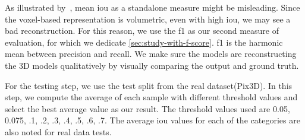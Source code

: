 As illustrated by~\cite{Tatarchenko2019}, mean \gls{iou} as a standalone measure might be misleading.
Since the voxel-based representation is volumetric, even with high \gls{iou}, we may see a bad reconstruction.
For this reason, we use the \gls{f1} as our second measure of evaluation, for which we dedicate \autoref{sec:study-with-f-score}.
\gls{f1} is the harmonic mean between precision and recall.
We make sure the models are reconstructing the 3D models qualitatively by visually comparing the output and ground truth.

For the testing step, we use the test split from the real dataset(Pix3D).
In this step, we compute the average of each sample with different threshold values and select the best average value as our result.
The threshold values used are 0.05, 0.075, .1, .2, .3, .4, .5, .6, .7.
The average \gls{iou} values for each of the categories are also noted for real data tests.





